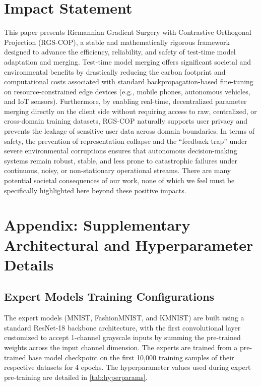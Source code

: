 \documentclass{article}
\theoremstyle{plain}
\theoremstyle{definition}
\theoremstyle{remark}
\begin{document}
\section*{Impact Statement}
This paper presents Riemannian Gradient Surgery with Contrastive Orthogonal Projection (RGS-COP), a stable and mathematically rigorous framework designed to advance the efficiency, reliability, and safety of test-time model adaptation and merging. Test-time model merging offers significant societal and environmental benefits by drastically reducing the carbon footprint and computational costs associated with standard backpropagation-based fine-tuning on resource-constrained edge devices (e.g., mobile phones, autonomous vehicles, and IoT sensors). Furthermore, by enabling real-time, decentralized parameter merging directly on the client side without requiring access to raw, centralized, or cross-domain training datasets, RGS-COP naturally supports user privacy and prevents the leakage of sensitive user data across domain boundaries. In terms of safety, the prevention of representation collapse and the ``feedback trap'' under severe environmental corruptions ensures that autonomous decision-making systems remain robust, stable, and less prone to catastrophic failures under continuous, noisy, or non-stationary operational streams. There are many potential societal consequences of our work, none of which we feel must be specifically highlighted here beyond these positive impacts.




\newpage
\appendix
\onecolumn
\section{Appendix: Supplementary Architectural and Hyperparameter Details}

\subsection{Expert Models Training Configurations}
The expert models (MNIST, FashionMNIST, and KMNIST) are built using a standard ResNet-18 backbone architecture, with the first convolutional layer customized to accept 1-channel grayscale inputs by summing the pre-trained weights across the input channel dimension. The experts are trained from a pre-trained base model checkpoint on the first 10,000 training samples of their respective datasets for 4 epochs. The hyperparameter values used during expert pre-training are detailed in \cref{tab:hyperparams}.
\end{document}
